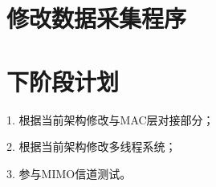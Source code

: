 \documentclass{article}
\begin{document}
\section{修改数据采集程序}




\section{下阶段计划}
1. 根据当前架构修改与MAC层对接部分；

2. 根据当前架构修改多线程系统；

3. 参与MIMO信道测试。
\end{document}
